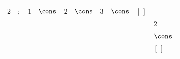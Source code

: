 {\scriptsize\setlength{\tabcolsep}{1.5pt}%
\begin{tabular}{ccccccccc|l}
$2$ & $;$ & $1$ & $\cons$ & $2$ & $\cons$ & $3$ & $\cons$ & $[\,]$ & \\ \hline
\gcell{$\posC{\circ}$} & \gcell{$$} & \gcell{$\posC{\circ}$} & \gcell{$\posC{\circ}$} & \gcell{$\posD{\bullet}$} & \gcell{$\posC{\circ}$} & \gcell{$$} & \gcell{$$} & \gcell{$$} & $2$ \\
\gcell{$\posC{\circ}$} & \gcell{$$} & \gcell{$\posC{\circ}$} & \gcell{$\posC{\circ}$} & \gcell{$\posC{\circ}$} & \gcell{$\posC{\circ}$} & \gcell{$$} & \gcell{$$} & \gcell{$$} & $\cons$ \\
\gcell{$\posC{\circ}$} & \gcell{$$} & \gcell{$\posC{\circ}$} & \gcell{$\posC{\circ}$} & \gcell{$\posC{\circ}$} & \gcell{$\posC{\circ}$} & \gcell{$\posC{\circ}$} & \gcell{$\posC{\circ}$} & \gcell{$\posC{\circ}$} & $[\,]$ \\
\end{tabular}}
